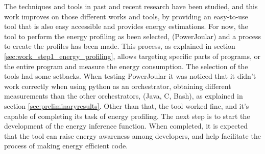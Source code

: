 \documentclass[sigplan]{acmart}
\begin{document}
The techniques and tools in past and recent research have been studied, and this work improves on those different works and tools, by providing an easy-to-use tool that is also easy accessible and provides energy estimations.
For now, the tool to perform the energy profiling as been selected, (PowerJoular) and a process to create the profiles has been made. This process, as explained in section \ref{sec:work_step1_energy_profiling}, allows targeting specific parts of programs, or the entire program and measure the energy consumption. The selection of the tools had some setbacks. When testing PowerJoular it was noticed that it didn't work correctly when using python as an orchestrator, obtaining different measurements than the other orchestrators, (Java, C, Bash), as explained in section \ref{sec:preliminaryresults}. Other than that, the tool worked fine, and it's capable of completing its task of energy profiling. The next step is to start the development of the energy inference function. When completed, it is expected that the tool can raise energy awareness among developers, and help facilitate the process of making energy efficient code.


%
%




\end{document}
